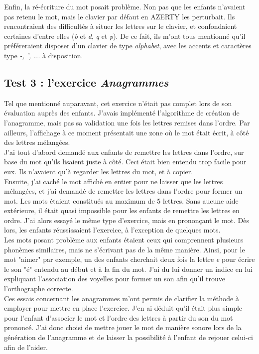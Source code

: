 Enfin, la ré-écriture du mot posait problème. Non pas que les enfants n'avaient pas retenu le mot, mais le clavier par défaut en AZERTY les perturbait. Ils rencontraient des difficultés à situer les lettres sur le clavier, et confondaient certaines d'entre elles (\textit{b} et \textit{d}, \textit{q} et \textit{p}). De ce fait, ils m'ont tous mentionné qu'il préféreraient disposer d'un clavier de type \textit{alphabet}, avec les accents et caractères type \textit{-, ', ...} à disposition.

\subsection{Test 3 : l'exercice \textit{Anagrammes}\label{testAna}}
Tel que mentionné auparavant, cet exercice n'était pas complet lors de son évaluation auprès des enfants. J'avais implémenté l'algorithme de création de l'anagramme, mais pas sa validation une fois les lettres remises dans l'ordre. Par ailleurs, l'affichage à ce moment présentait une zone où le mot était écrit, à côté des lettres mélangées.\\

J'ai tout d'abord demandé aux enfants de remettre les lettres dans l'ordre, sur base du mot qu'ils lisaient juste à côté. Ceci était bien entendu trop facile pour eux. Ils n'avaient qu'à regarder les lettres du mot, et à copier.\\

Ensuite, j'ai caché le mot affiché en entier pour ne laisser que les lettres mélangées, et j'ai demandé de remettre les lettres dans l'ordre pour former un mot. Les mots étaient constitués au maximum de 5 lettres. Sans aucune aide extérieure, il était quasi impossible pour les enfants de remettre les lettres en ordre. J'ai alors essayé le même type d'exercice, mais en prononçant le mot. Dès lors, les enfants réussissaient l'exercice, à l'exception de quelques mots.\\

Les mots posant problème aux enfants étaient ceux qui comprennent plusieurs phonèmes similaires, mais ne s'écrivant pas de la même manière. Ainsi, pour le mot "aimer" par exemple, un des enfants cherchait deux fois la lettre \textit{e} pour écrire le son "é" entendu au début et à la fin du mot. J'ai du lui donner un indice en lui expliquant l'association des voyelles pour former un son afin qu'il trouve l'orthographe correcte.\\

Ces essais concernant les anagrammes m'ont permis de clarifier la méthode à employer pour mettre en place l'exercice. J'en ai déduit qu'il était plus simple pour l'enfant d'associer le mot et l'ordre des lettres à partir du son du mot prononcé. J'ai donc choisi de mettre jouer le mot de manière sonore lors de la génération de l'anagramme et de laisser la possibilité à l'enfant de rejouer celui-ci afin de l'aider.

